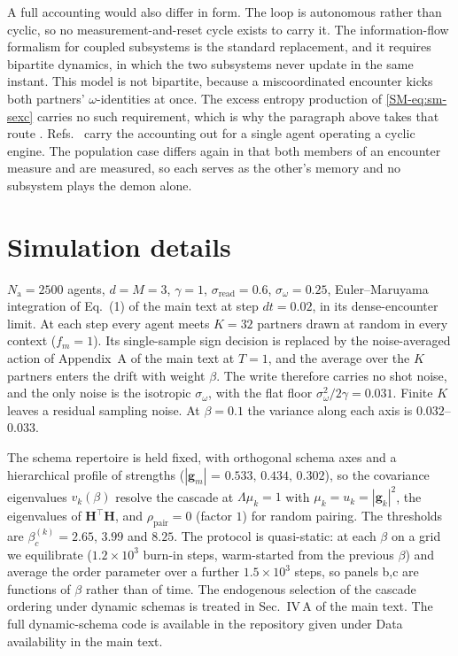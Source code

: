 \documentclass[
  aps,prx,
  preprint,
  superscriptaddress,
  nofootinbib
]{revtex4-2}
\newcommand{\g}{\mathbf{g}}
\newcommand{\rhopair}{\rho_{\mathrm{pair}}}
\newcommand{\sread}{\sigma_{\mathrm{read}}}
\newcommand{\sidn}{\sigma_{\omega}}
\newcommand{\Nag}{N_{\mathrm{a}}}
\begin{document}
A full accounting would also differ in form. The loop is autonomous rather than cyclic, so no measurement-and-reset cycle exists to carry it. The information-flow formalism for coupled subsystems \cite{horowitz2014} is the standard replacement, and it requires bipartite dynamics, in which the two subsystems never update in the same instant. This model is not bipartite, because a miscoordinated encounter kicks both partners' $\omega$-identities at once. The excess entropy production of \cref{SM-eq:sm-sexc} carries no such requirement, which is why the paragraph above takes that route \cite{cocconi2024}. Refs.~\cite{still2020,STILL} carry the accounting out for a single agent operating a cyclic engine. The population case differs again in that both members of an encounter measure and are measured, so each serves as the other's memory and no subsystem plays the demon alone.

\bigskip
\section{Simulation details}\label{sm:simdetails}

\noindent $\Nag=2500$ agents, $d=M=3$, $\gamma=1$, $\sread=0.6$, $\sidn=0.25$, Euler--Maruyama integration of Eq.~(1) of the main text at step $dt=0.02$, in its dense-encounter limit. At each step every agent meets $K=32$ partners drawn at random in every context ($f_m=1$). Its single-sample sign decision is replaced by the noise-averaged action of Appendix~A of the main text at $T=1$, and the average over the $K$ partners enters the drift with weight $\beta$. The write therefore carries no shot noise, and the only noise is the isotropic $\sidn$, with the flat floor $\sidn^2/2\gamma=0.031$. Finite $K$ leaves a residual sampling noise. At $\beta=0.1$ the variance along each axis is $0.032$--$0.033$.

The schema repertoire is held fixed, with orthogonal schema axes and a hierarchical profile of strengths ($|\g_m|$ = $0.533,\,0.434,\,0.302$), so the covariance eigenvalues $v_k(\beta)$ resolve the cascade at $\Lambda\mu_k=1$ with $\mu_k=u_k=|\g_k|^2$, the eigenvalues of $\bm{H}^{\!\top}\bm{H}$, and $\rhopair=0$ (factor $1$) for random pairing. The thresholds are $\beta_c^{(k)}=2.65$, $3.99$ and $8.25$. The protocol is quasi-static: at each $\beta$ on a grid we equilibrate ($1.2\times10^3$ burn-in steps, warm-started from the previous $\beta$) and average the order parameter over a further $1.5\times10^3$ steps, so panels b,c are functions of $\beta$ rather than of time. The endogenous selection of the cascade ordering under dynamic schemas is treated in Sec.~IV\,A of the main text. The full dynamic-schema code is available in the repository given under Data availability in the main text.
\end{document}

